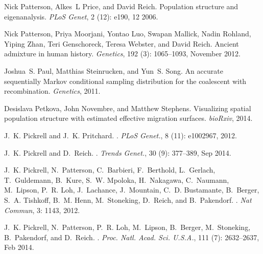 \documentclass[10pt,letterpaper]{article}
\begin{document}
\begin{thebibliography}{80}
Nick Patterson, Alkes~L Price, and David Reich.
\newblock Population structure and eigenanalysis.
\newblock \emph{PLoS Genet}, 2 (12): e190, 12 2006.

Nick Patterson, Priya Moorjani, Yontao Luo, Swapan Mallick, Nadin Rohland,
  Yiping Zhan, Teri Genschoreck, Teresa Webster, and David Reich.
\newblock Ancient admixture in human history.
\newblock \emph{Genetics}, 192 (3): 1065--1093, November
  2012.

Joshua~S. Paul, Matthias Steinrucken, and Yun~S. Song.
\newblock An accurate sequentially {Markov} conditional sampling distribution
  for the coalescent with recombination.
\newblock \emph{Genetics}, 2011.

Desislava Petkova, John Novembre, and Matthew Stephens.
\newblock Visualizing spatial population structure with estimated effective
  migration surfaces.
\newblock \emph{bioRxiv}, 2014.

J.~K. Pickrell and J.~K. Pritchard.
.
\newblock \emph{PLoS Genet.}, 8 (11): e1002967, 2012.

J.~K. Pickrell and D.~Reich.
.
\newblock \emph{Trends Genet.}, 30 (9): 377--389, Sep 2014.

J.~K. Pickrell, N.~Patterson, C.~Barbieri, F.~Berthold, L.~Gerlach,
  T.~Guldemann, B.~Kure, S.~W. Mpoloka, H.~Nakagawa, C.~Naumann, M.~Lipson,
  P.~R. Loh, J.~Lachance, J.~Mountain, C.~D. Bustamante, B.~Berger, S.~A.
  Tishkoff, B.~M. Henn, M.~Stoneking, D.~Reich, and B.~Pakendorf.
.
\newblock \emph{Nat Commun}, 3: 1143, 2012.

J.~K. Pickrell, N.~Patterson, P.~R. Loh, M.~Lipson, B.~Berger, M.~Stoneking,
  B.~Pakendorf, and D.~Reich.
.
\newblock \emph{Proc. Natl. Acad. Sci. U.S.A.}, 111 (7):
  2632--2637, Feb 2014.


\end{thebibliography}
\end{document}
